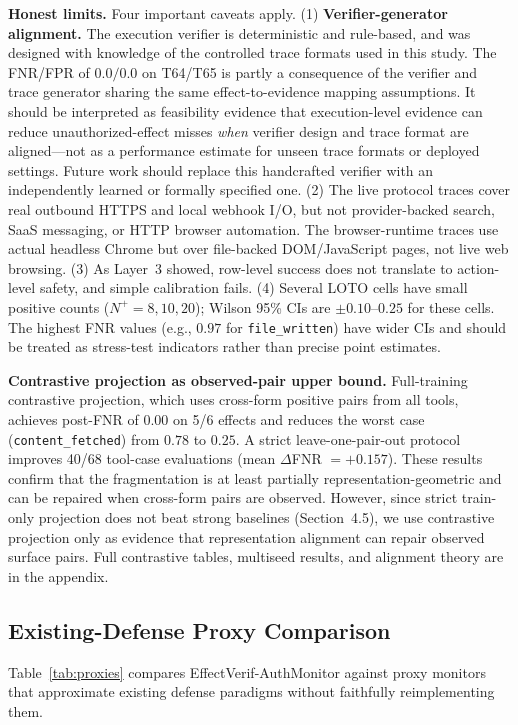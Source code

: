 \documentclass{article}
\begin{document}
\textbf{Honest limits.} Four important caveats apply. (1) \textbf{Verifier-generator alignment.} The execution verifier is deterministic and rule-based, and was designed with knowledge of the controlled trace formats used in this study. The FNR/FPR of $0.0/0.0$ on T64/T65 is partly a consequence of the verifier and trace generator sharing the same effect-to-evidence mapping assumptions. It should be interpreted as feasibility evidence that execution-level evidence can reduce unauthorized-effect misses \emph{when} verifier design and trace format are aligned---not as a performance estimate for unseen trace formats or deployed settings. Future work should replace this handcrafted verifier with an independently learned or formally specified one. (2) The live protocol traces cover real outbound HTTPS and local webhook I/O, but not provider-backed search, SaaS messaging, or HTTP browser automation. The browser-runtime traces use actual headless Chrome but over file-backed DOM/JavaScript pages, not live web browsing. (3) As Layer~3 showed, row-level success does not translate to action-level safety, and simple calibration fails. (4) Several LOTO cells have small positive counts ($N^+ = 8, 10, 20$); Wilson 95\% CIs are $\pm 0.10$--$0.25$ for these cells. The highest FNR values (e.g., $0.97$ for \texttt{file\_written}) have wider CIs and should be treated as stress-test indicators rather than precise point estimates.

\textbf{Contrastive projection as observed-pair upper bound.} Full-training contrastive projection, which uses cross-form positive pairs from all tools, achieves post-FNR of $0.00$ on 5/6 effects and reduces the worst case (\texttt{content\_fetched}) from $0.78$ to $0.25$. A strict leave-one-pair-out protocol improves 40/68 tool-case evaluations (mean $\Delta$FNR $=+0.157$). These results confirm that the fragmentation is at least partially representation-geometric and can be repaired when cross-form pairs are observed. However, since strict train-only projection does not beat strong baselines (Section~4.5), we use contrastive projection only as evidence that representation alignment can repair observed surface pairs. Full contrastive tables, multiseed results, and alignment theory are in the appendix.

\subsection{Existing-Defense Proxy Comparison}

Table~\ref{tab:proxies} compares EffectVerif-AuthMonitor against proxy monitors that approximate existing defense paradigms without faithfully reimplementing them.
\end{document}
